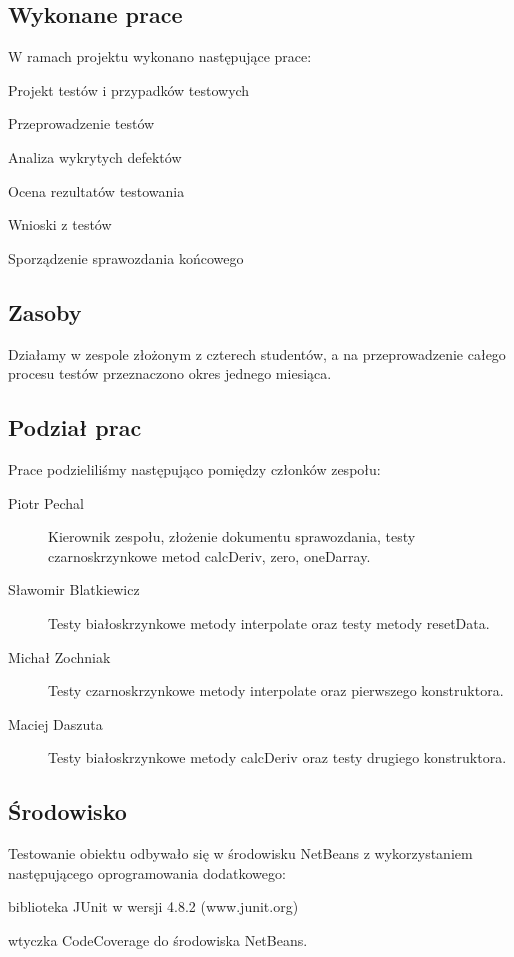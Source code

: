 \documentclass[12pt,a4paper,notitlepage]{article}
\begin{document}
\subsection{Wykonane prace}
W ramach projektu wykonano następujące prace:
\begin{itemize*}
\item{Projekt testów i przypadków testowych}
\item{Przeprowadzenie testów}
\item{Analiza wykrytych defektów}
\item{Ocena rezultatów testowania}
\item{Wnioski z testów}
\item{Sporządzenie sprawozdania końcowego}
\end{itemize*}

\subsection{Zasoby}
Działamy w zespole złożonym z czterech studentów, a na przeprowadzenie całego procesu testów przeznaczono okres jednego miesiąca.

\subsection{Podział prac}
Prace podzieliliśmy następująco pomiędzy członków zespołu:
\begin{description}
\item [Piotr Pechal] Kierownik zespołu, złożenie dokumentu sprawozdania, testy czarnoskrzynkowe metod calcDeriv, zero, oneDarray.
\item [Sławomir Blatkiewicz] Testy białoskrzynkowe metody interpolate oraz testy metody resetData.
\item [Michał Zochniak] Testy czarnoskrzynkowe metody interpolate oraz pierwszego konstruktora.
\item [Maciej Daszuta] Testy białoskrzynkowe metody calcDeriv oraz testy drugiego konstruktora.
\end{description}

\subsection{Środowisko}
Testowanie obiektu odbywało się w środowisku NetBeans z wykorzystaniem następującego oprogramowania dodatkowego:
\begin{itemize*}
\item{biblioteka JUnit w wersji 4.8.2 (www.junit.org)}
\item{wtyczka CodeCoverage do środowiska NetBeans.}
\end{itemize*}
\end{document}
